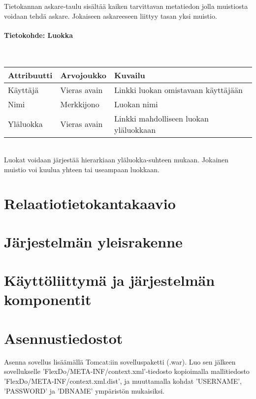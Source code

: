 ﻿\documentclass[finnish]{article}
\begin{document}
\vspace{5pt}
Tietokannan askare-taulu sisältää kaiken tarvittavan metatiedon jolla muistiosta voidaan tehdä askare.
Jokaiseen askareeseen liittyy tasan yksi muistio.


\paragraph{Tietokohde: Luokka} ~\\

\begin{tabular}{ | l | l | l | }
  \hline
  Attribuutti & Arvojoukko & Kuvailu \\ \hline
  Käyttäjä & Vieras avain & Linkki luokan omistavaan käyttäjään \\
  Nimi & Merkkijono & Luokan nimi \\
  Yläluokka & Vieras avain & Linkki mahdolliseen luokan yläluokkaan \\
  \hline
\end{tabular} \\

\vspace{5pt}
Luokat voidaan järjestää hierarkiaan yläluokka-suhteen mukaan. Jokainen muistio voi kuulua yhteen tai useampaan luokkaan.


\section{Relaatiotietokantakaavio}



\section{Järjestelmän yleisrakenne}



\section{Käyttöliittymä ja järjestelmän komponentit}



\section{Asennustiedostot}

Asenna sovellus lisäämällä Tomcat:iin sovelluspaketti (.war). Luo sen jälkeen sovellukselle 'FlexDo/META-INF/context.xml'-tiedosto kopioimalla mallitiedosto 'FlexDo/META-INF/context.xml.dist', ja muuttamalla kohdat 'USERNAME', 'PASSWORD' ja 'DBNAME' ympäristön mukaisiksi.
\end{document}
